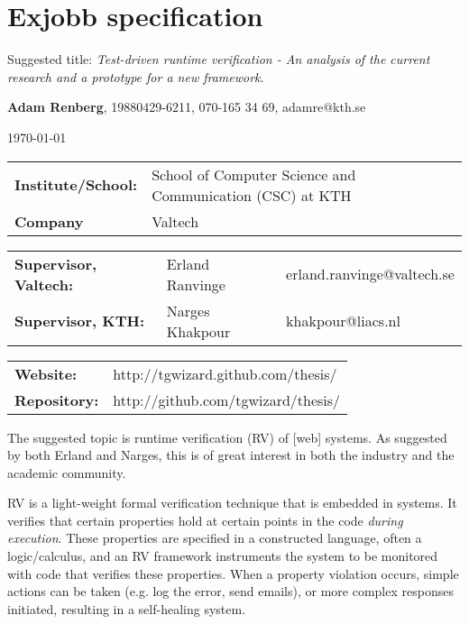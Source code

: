 \documentclass[a4paper,11pt]{kth-mag}
\begin{document}
\removepagenumbers%
\setlength\parindent{0em}
\setlength\parskip{1em}

\pagestyle{empty}


\chapter*{Exjobb specification}

Suggested title: \textit{Test-driven runtime verification - An analysis
of the current research and a prototype for a new framework}.

\textbf{Adam Renberg}, 19880429-6211, 070-165 34 69, adamre@kth.se

\today

\begin{tabular}{lll}
	\textbf{Institute/School:} & School of Computer Science and Communication (CSC) at KTH \\
    \textbf{Company}           & Valtech \\
\end{tabular}

\begin{tabular}{lll}
	\textbf{Supervisor, Valtech:} & Erland Ranvinge & erland.ranvinge@valtech.se \\
    \textbf{Supervisor, KTH:}     & Narges Khakpour & khakpour@liacs.nl \\
\end{tabular}

\begin{tabular}{ll}
    \textbf{Website:} & http://tgwizard.github.com/thesis/ \\
    \textbf{Repository:} & http://github.com/tgwizard/thesis/ \\
\end{tabular}


The suggested topic is runtime verification (RV) of [web] systems. As suggested
by both Erland and Narges, this is of great interest in both the industry and
the academic community.

RV is a light-weight formal verification technique that is embedded in systems.
It verifies that certain properties hold at certain points in the code
\textit{during execution}. These properties are specified in a constructed
language, often a logic/calculus, and an RV framework instruments the system to
be monitored with code that verifies these properties. When a property
violation occurs, simple actions can be taken (e.g. log the error, send
emails), or more complex responses initiated, resulting in a self-healing
system.
\end{document}
